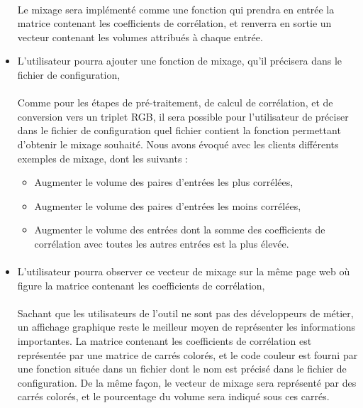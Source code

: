 \documentclass{article}
\begin{document}
\begin{itemize}
       \paragraph{}
       Le mixage sera implémenté comme une fonction qui prendra en entrée la
       matrice contenant les coefficients de corrélation, et renverra en sortie
       un vecteur contenant les volumes attribués à chaque entrée.\\
       
 \item L'utilisateur pourra ajouter une fonction de mixage, qu'il précisera
       dans le fichier de configuration,
       \paragraph{}
       Comme pour les étapes de pré-traitement, de calcul de corrélation, et de
       conversion vers un triplet RGB, il sera possible pour l'utilisateur de
       préciser dans le fichier de configuration quel fichier contient la
       fonction permettant d'obtenir le mixage souhaité. Nous avons évoqué avec
       les clients différents exemples de mixage, dont les suivants :
       \begin{itemize}
        \item Augmenter le volume des paires d'entrées les plus corrélées,
        \item Augmenter le volume des paires d'entrées les moins corrélées,
        \item Augmenter le volume des entrées dont la somme des coefficients de
              corrélation avec toutes les autres entrées est la plus élevée.
       \end{itemize}
       \paragraph{}
       
 \item L'utilisateur pourra observer ce vecteur de mixage sur la même page
       web où figure la matrice contenant les coefficients de corrélation,
       \paragraph{}
       Sachant que les utilisateurs de l'outil ne sont pas des développeurs de
       métier, un affichage graphique reste le meilleur moyen de représenter les
       informations importantes. La matrice contenant les coefficients de
       corrélation est représentée par une matrice de carrés colorés, et le
       code couleur est fourni par une fonction située dans un fichier dont le
       nom est précisé dans le fichier de configuration. De la même façon, le
       vecteur de mixage sera représenté par des carrés colorés, et le
       pourcentage du volume sera indiqué sous ces carrés.\\
       

\end{itemize}
\end{document}
